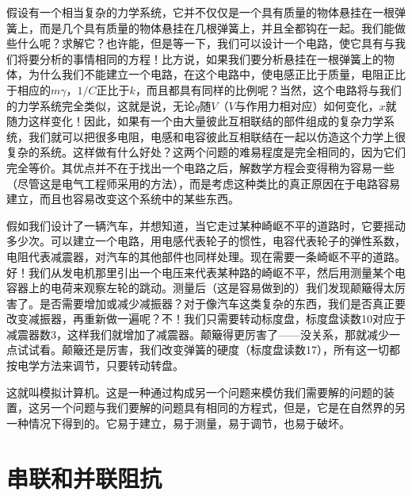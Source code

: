 假设有一个相当复杂的力学系统，它并不仅仅是一个具有质量的物体悬挂在一根弹簧上，而是几个具有质量的物体悬挂在几根弹簧上，并且全都钩在一起。我们能做些什么呢？求解它？也许能，但是等一下，我们可以设计一个电路，使它具有与我们将要分析的事情相同的方程！比方说，如果我们要分析悬挂在一根弹簧上的物体，为什么我们不能建立一个电路，在这个电路中，使电感正比于质量，电阻正比于相应的$m\gamma$，$1/C$正比于$k$，而且都具有同样的比例呢？当然，这个电路将与我们的力学系统完全类似，这就是说，无论$q$随$V$（$V$与作用力相对应）如何变化，$x$就随力这样变化！因此，如果有一个由大量彼此互相联结的部件组成的复杂力学系统，我们就可以把很多电阻，电感和电容彼此互相联结在一起以仿造这个力学上很复杂的系统。这样做有什么好处？这两个问题的难易程度是完全相同的，因为它们完全等价。其优点并不在于找出一个电路之后，解数学方程会变得稍为容易一些（尽管这是电气工程师采用的方法），而是考虑这种类比的真正原因在于电路容易建立，而且也容易改变这个系统中的某些东西。

假如我们设计了一辆汽车，并想知道，当它走过某种崎岖不平的道路时，它要摇动多少次。可以建立一个电路，用电感代表轮子的惯性，电容代表轮子的弹性系数，电阻代表减震器，对汽车的其他部件也同样处理。现在需要一条崎岖不平的道路。好！我们从发电机那里引出一个电压来代表某种路的崎岖不平，然后用测量某个电容器上的电荷来观察左轮的跳动。测量后（这是容易做到的）我们发现颠簸得太厉害了。是否需要增加或减少减振器？对于像汽车这类复杂的东西，我们是否真正要改变减振器，再重新做一遍呢？不！我们只需要转动标度盘，标度盘读数10对应于减震器数3，这样我们就增加了减震器。颠簸得更厉害了——没关系，那就减少一点试试看。颠簸还是厉害，我们改变弹簧的硬度（标度盘读数17），所有这一切都按电学方法来调节，只要转动转盘。

这就叫模拟计算机。这是一种通过构成另一个问题来模仿我们需要解的问题的装置，这另一个问题与我们要解的问题具有相同的方程式，但是，它是在自然界的另一种情况下得到的。它易于建立，易于测量，易于调节，也易于破坏。

\section{串联和并联阻抗}

